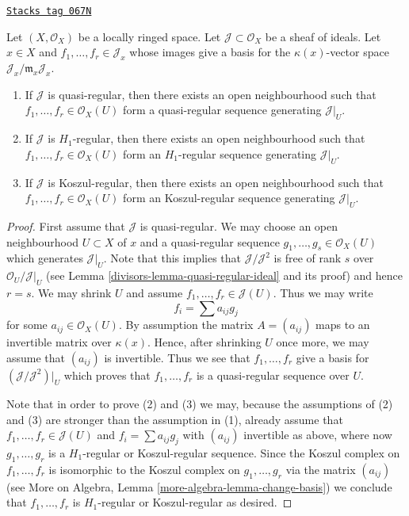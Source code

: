 \begin{lemma}
\label{divisors-lemma-generate-regular-ideal}
\href{https://stacks.math.columbia.edu/tag/067N}{\texttt{Stacks tag 067N}}

Let $(X, \mathcal{O}_X)$ be a locally ringed space.
Let $\mathcal{J} \subset \mathcal{O}_X$ be a sheaf of ideals.
Let $x \in X$ and $f_1, \ldots, f_r \in \mathcal{J}_x$ whose images
give a basis for the $\kappa(x)$-vector space
$\mathcal{J}_x/\mathfrak m_x\mathcal{J}_x$.
\begin{enumerate}
\item If $\mathcal{J}$ is quasi-regular, then there exists an open
neighbourhood such that $f_1, \ldots, f_r \in \mathcal{O}_X(U)$
form a quasi-regular sequence generating $\mathcal{J}|_U$.
\item If $\mathcal{J}$ is $H_1$-regular, then there exists an open
neighbourhood such that $f_1, \ldots, f_r \in \mathcal{O}_X(U)$
form an $H_1$-regular sequence generating $\mathcal{J}|_U$.
\item If $\mathcal{J}$ is Koszul-regular, then there exists an open
neighbourhood such that $f_1, \ldots, f_r \in \mathcal{O}_X(U)$
form an Koszul-regular sequence generating $\mathcal{J}|_U$.
\end{enumerate}
\end{lemma}

\begin{proof}

First assume that $\mathcal{J}$ is quasi-regular. We may choose an
open neighbourhood $U \subset X$ of $x$ and a quasi-regular sequence
$g_1, \ldots, g_s \in \mathcal{O}_X(U)$ which generates $\mathcal{J}|_U$.
Note that this implies that $\mathcal{J}/\mathcal{J}^2$ is free of
rank $s$ over $\mathcal{O}_U/\mathcal{J}|_U$ (see
Lemma \ref{divisors-lemma-quasi-regular-ideal}
and its proof) and hence $r = s$.
We may shrink $U$ and assume $f_1, \ldots, f_r \in \mathcal{J}(U)$.
Thus we may write
$$
f_i = \sum a_{ij} g_j
$$
for some $a_{ij} \in \mathcal{O}_X(U)$. By assumption the matrix
$A = (a_{ij})$ maps to an invertible matrix over $\kappa(x)$.
Hence, after shrinking $U$ once more, we may assume that $(a_{ij})$
is invertible. Thus we see that $f_1, \ldots, f_r$ give a basis
for $(\mathcal{J}/\mathcal{J}^2)|_U$ which proves that $f_1, \ldots, f_r$
is a quasi-regular sequence over $U$.

\medskip\noindent
Note that in order to prove (2) and (3) we may, because the assumptions
of (2) and (3) are stronger than the assumption in (1), already assume that
$f_1, \ldots, f_r \in \mathcal{J}(U)$ and $f_i = \sum a_{ij}g_j$
with $(a_{ij})$ invertible as above, where now $g_1, \ldots, g_r$
is a $H_1$-regular or Koszul-regular sequence. Since the Koszul complex
on $f_1, \ldots, f_r$ is isomorphic to the Koszul complex on
$g_1, \ldots, g_r$ via the matrix $(a_{ij})$ (see
More on Algebra, Lemma \ref{more-algebra-lemma-change-basis})
we conclude that $f_1, \ldots, f_r$ is $H_1$-regular or Koszul-regular
as desired.
\end{proof}

